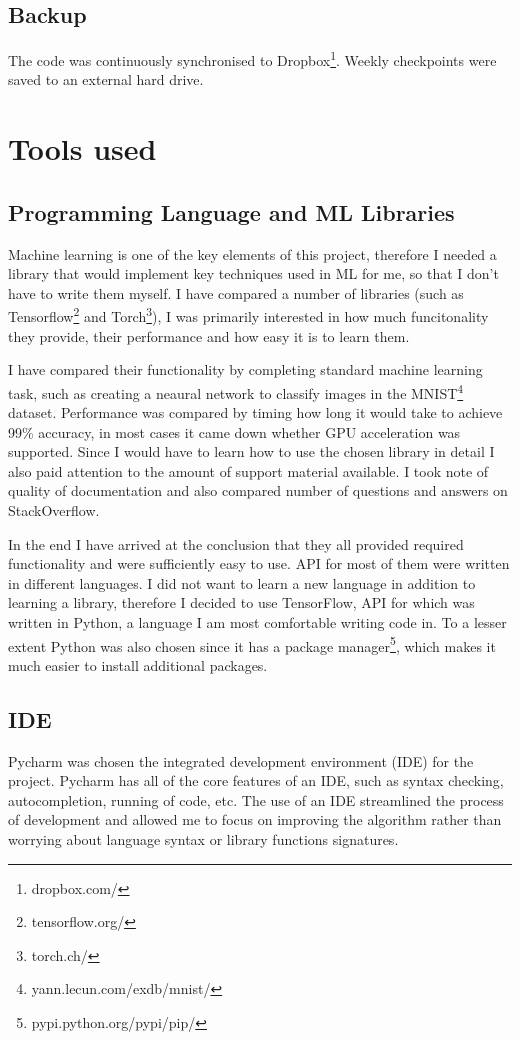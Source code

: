 \documentclass[12pt,a4paper]{book}
\begin{document}
\subsection{Backup}
The code was continuously synchronised to Dropbox\footnote{dropbox.com/}.
Weekly checkpoints were saved to an external hard drive.
\section{Tools used}
\subsection{Programming Language and ML Libraries}
Machine learning is one of the key elements of this project, therefore I needed a library that would implement key techniques used in ML for me, so that I don't have to write them myself.
I have compared a number of libraries (such as Tensorflow\footnote{tensorflow.org/} and Torch\footnote{torch.ch/}), I was primarily interested in how much funcitonality they provide, their performance and how easy it is to learn them.

I have compared their functionality by completing standard machine learning task, such as creating a neaural network to classify images in the MNIST\footnote{yann.lecun.com/exdb/mnist/} dataset.
Performance was compared by timing how long it would take to achieve 99\% accuracy, in most cases it came down whether GPU acceleration was supported.
Since I would have to learn how to use the chosen library in detail I also paid attention to the amount of support material available.
I took note of quality of documentation and also compared number of questions and answers on StackOverflow.

In the end I have arrived at the conclusion that they all provided required functionality and were sufficiently easy to use.
API for most of them were written in different languages.
I did not want to learn a new language in addition to learning a library, therefore I decided to use TensorFlow, API for which was written in Python, a language I am most comfortable writing code in.
To a lesser extent Python was also chosen since it has a package manager\footnote{pypi.python.org/pypi/pip/}, which makes it much easier to install additional packages.

\subsection{IDE}
Pycharm was chosen the integrated development environment (IDE) for the project.
Pycharm has all of the core features of an IDE, such as syntax checking, autocompletion, running of code, etc.
The use of an IDE streamlined the process of development and allowed me to focus on improving the algorithm rather than worrying about language syntax or library functions signatures. 
\end{document}
